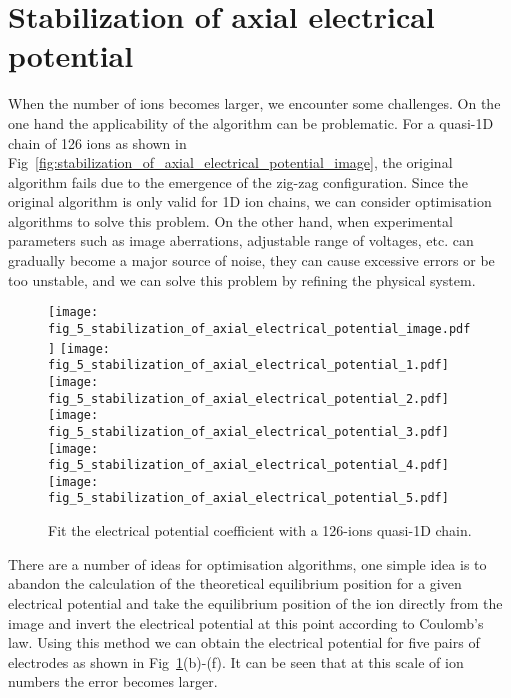 \section{Stabilization of axial electrical potential}

When the number of ions becomes larger, we encounter some challenges. On the one hand the applicability of the algorithm can be problematic. For a quasi-1D chain of 126 ions as shown in Fig~\ref{fig:stabilization_of_axial_electrical_potential_image}, the original algorithm fails due to the emergence of the zig-zag configuration. Since the original algorithm is only valid for 1D ion chains, we can consider optimisation algorithms to solve this problem. On the other hand, when experimental parameters such as image aberrations, adjustable range of voltages, etc. can gradually become a major source of noise, they can cause excessive errors or be too unstable, and we can solve this problem by refining the physical system.

\begin{figure}
    \centering
    \subcaptionbox{\label{fig:stabilization_of_axial_electrical_potential_image}}
    {\texttt{[image: fig\_5\_stabilization\_of\_axial\_electrical\_potential\_image.pdf]}}
    \subcaptionbox{\label{fig:stabilization_of_axial_electrical_potential_1}}
    {\texttt{[image: fig\_5\_stabilization\_of\_axial\_electrical\_potential\_1.pdf]}}
    \subcaptionbox{\label{fig:stabilization_of_axial_electrical_potential_2}}
    {\texttt{[image: fig\_5\_stabilization\_of\_axial\_electrical\_potential\_2.pdf]}}
    \subcaptionbox{\label{fig:stabilization_of_axial_electrical_potential_3}}
    {\texttt{[image: fig\_5\_stabilization\_of\_axial\_electrical\_potential\_3.pdf]}}
    \subcaptionbox{\label{fig:stabilization_of_axial_electrical_potential_4}}
    {\texttt{[image: fig\_5\_stabilization\_of\_axial\_electrical\_potential\_4.pdf]}}
    \subcaptionbox{\label{fig:stabilization_of_axial_electrical_potential_5}}
    {\texttt{[image: fig\_5\_stabilization\_of\_axial\_electrical\_potential\_5.pdf]}}
    \caption{Fit the electrical potential coefficient with a 126-ions quasi-1D chain.}
    \label{fig:stabilization_of_axial_electrical_potential}
\end{figure}

There are a number of ideas for optimisation algorithms, one simple idea is to abandon the calculation of the theoretical equilibrium position for a given electrical potential and take the equilibrium position of the ion directly from the image and invert the electrical potential at this point according to Coulomb's law. Using this method we can obtain the electrical potential for five pairs of electrodes as shown in Fig~\ref{fig:stabilization_of_axial_electrical_potential}(b)-(f). It can be seen that at this scale of ion numbers the error becomes larger.